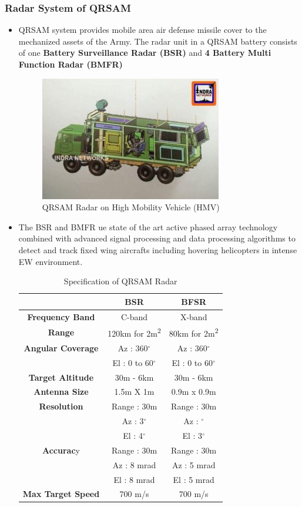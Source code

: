 \documentclass[12pt]{article} %
\begin{document}
\subsubsection{Radar System of QRSAM}
\begin{itemize}
\item QRSAM system provides mobile area air defense missile cover to the mechanized assets of the Army. The radar unit in a QRSAM battery consists of one \textbf{Battery Surveillance Radar (BSR)} and \textbf{4 Battery Multi Function Radar (BMFR)}
 \begin{figure}[H]
 \centering
    \includegraphics[width=0.7\linewidth]{qrsamradar.jpg}
  \caption{QRSAM Radar on High Mobility Vehicle (HMV)}
  \label{fig:figure 3}
\end{figure}
\item The BSR and BMFR ue state of the art active phased array technology combined with advanced signal processing and data processing algorithms to detect and track fixed wing aircrafts including hovering helicopters in intense EW environment.
\begin{table}[H]
\centering
\begin{tabular}{|c |c |c| }\toprule
&\textbf{BSR} & \textbf{BFSR}\\ \midrule
\textbf{Frequency Band} & C-band & X-band \\ \midrule
\textbf{Range} & 120km for 2m\textsuperscript{2} & 80km for 2m\textsuperscript{2} \\ \midrule
\textbf{Angular Coverage} & Az : 360$^{\circ}$ & Az : 360$^{\circ}$ \\ 
& El : 0 to 60$^{\circ}$ & El : 0 to 60$^{\circ}$\\ \midrule
\textbf{Target Altitude} & 30m - 6km & 30m - 6km\\ \midrule
\textbf{Antenna Size} & 1.5m X 1m & 0.9m x 0.9m\\ \midrule
\textbf{Resolution} & Range : 30m& Range : 30m\\ \midrule
&Az : 3$^{\circ}$ & Az : $^{\circ}$\\
&El : 4$^{\circ}$ & El : 3$^{\circ}$\\ \midrule
\textbf{Accurac}y & Range : 30m & Range : 30m\\ 
&Az : 8 mrad & Az : 5 mrad\\
&El : 8 mrad & El : 5 mrad\\ \midrule
\textbf{Max Target Speed} & 700 m/s & 700 m/s\\ \bottomrule
\end{tabular}
\caption{Specification of QRSAM Radar}
\end{table}



\end{itemize}
\end{document}
